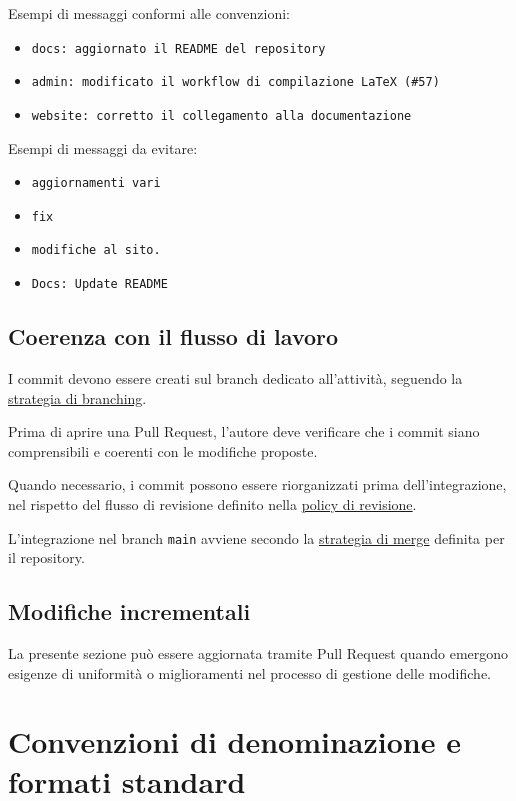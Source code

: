 \documentclass[11pt, a4paper]{article}
\begin{document}
Esempi di messaggi conformi alle convenzioni:
\begin{itemize}
    \item \texttt{docs: aggiornato il README del repository}
    \item \texttt{admin: modificato il workflow di compilazione LaTeX (\#57)}
    \item \texttt{website: corretto il collegamento alla documentazione}
\end{itemize}

\noindent Esempi di messaggi da evitare:
\begin{itemize}
    \item \texttt{aggiornamenti vari}
    \item \texttt{fix}
    \item \texttt{modifiche al sito.}
    \item \texttt{Docs: Update README}
\end{itemize}

\subsection{Coerenza con il flusso di lavoro}

I commit devono essere creati sul branch dedicato all'attività, seguendo la \hyperref[subsec:creazione-dei-branch]{strategia di branching}.

Prima di aprire una Pull Request, l'autore deve verificare che i commit siano comprensibili e coerenti con le modifiche proposte.

Quando necessario, i commit possono essere riorganizzati prima dell'integrazione, nel rispetto del flusso di revisione definito nella \hyperref[subsec:regole-generali]{policy di revisione}.

L'integrazione nel branch \texttt{main} avviene secondo la \hyperref[subsec:pull-request-e-merge]{strategia di merge} definita per il repository.

\subsection{Modifiche incrementali}

La presente sezione può essere aggiornata tramite Pull Request quando emergono esigenze di uniformità o miglioramenti nel processo di gestione delle modifiche.

\section{Convenzioni di denominazione e formati standard}
\end{document}

